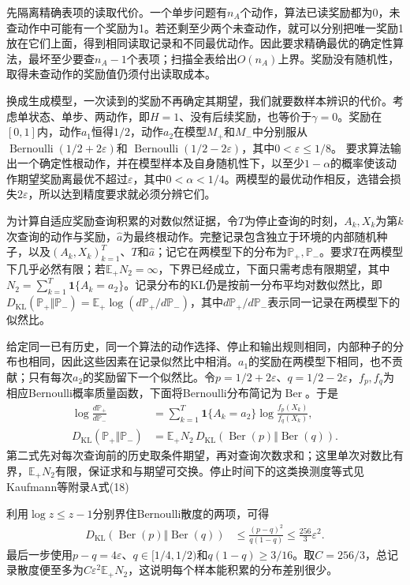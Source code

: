 先隔离精确表项的读取代价。一个单步问题有$n_A$个动作，算法已读奖励都为0，未查动作中可能有一个奖励为1。若还剩至少两个未查动作，就可以分别把唯一奖励1放在它们上面，得到相同读取记录和不同最优动作。因此要求精确最优的确定性算法，最坏至少要查$n_A-1$个表项；扫描全表给出$O(n_A)$上界。奖励没有随机性，取得未查动作的奖励值仍须付出读取成本。

换成生成模型，一次读到的奖励不再确定其期望，我们就要数样本辨识的代价。考虑单状态、单步、两动作，即$H=1$、没有后续奖励，也等价于$\gamma=0$。奖励在$[0,1]$内，动作$a_1$恒得$1/2$，动作$a_2$在模型$M_+$和$M_-$中分别服从
$\operatorname{Bernoulli}(1/2+2\varepsilon)$和
$\operatorname{Bernoulli}(1/2-2\varepsilon)$，其中$0<\varepsilon\leq1/8$。
要求算法输出一个确定性根动作，并在模型样本及自身随机性下，以至少$1-\alpha$的概率使该动作期望奖励离最优不超过$\varepsilon$，其中$0<\alpha<1/4$。两模型的最优动作相反，选错会损失$2\varepsilon$，所以达到精度要求就必须分辨它们。

为计算自适应奖励查询积累的对数似然证据，令$T$为停止查询的时刻，$A_k,X_k$为第$k$次查询的动作与奖励，$\widehat a$为最终根动作。完整记录包含独立于环境的内部随机种子，以及$(A_k,X_k)_{k=1}^T$、$T$和$\widehat a$；记它在两模型下的分布为$\mathbb P_+,\mathbb P_-$。要求$T$在两模型下几乎必然有限；若$\mathbb E_+N_2=\infty$，下界已经成立，下面只需考虑有限期望，其中$N_2=\sum_{k=1}^T\mathbf1\{A_k=a_2\}$。记录分布的KL仍是按前一分布平均对数似然比，即$D_{\mathrm{KL}}(\mathbb P_+\Vert\mathbb P_-)=\mathbb E_+\log(d\mathbb P_+/d\mathbb P_-)$，其中$d\mathbb P_+/d\mathbb P_-$表示同一记录在两模型下的似然比。

给定同一已有历史，同一个算法的动作选择、停止和输出规则相同，内部种子的分布也相同，因此这些因素在记录似然比中相消。$a_1$的奖励在两模型下相同，也不贡献；只有每次$a_2$的奖励留下一个似然比。令$p=1/2+2\varepsilon$、$q=1/2-2\varepsilon$，$f_p,f_q$为相应Bernoulli概率质量函数，下面将Bernoulli分布简记为$\operatorname{Ber}$。于是
\[
 \begin{aligned}
 \log\frac{d\mathbb P_+}{d\mathbb P_-}
 &=\sum_{k=1}^{T}\mathbf1\{A_k=a_2\}
          \log\frac{f_p(X_k)}{f_q(X_k)},\\
 D_{\mathrm{KL}}(\mathbb P_+\Vert\mathbb P_-)
 &=\mathbb E_+N_2\,
       D_{\mathrm{KL}}(\operatorname{Ber}(p)\Vert\operatorname{Ber}(q)).
 \end{aligned}
\]
第二式先对每次查询前的历史取条件期望，再对查询次数求和；这里单次对数比有界，$\mathbb E_+N_2$有限，保证求和与期望可交换。停止时间下的这类换测度等式见Kaufmann等附录A式(18)

利用$\log z\leq z-1$分别界住Bernoulli散度的两项，可得
\[
 \begin{aligned}
 D_{\mathrm{KL}}(\operatorname{Ber}(p)\Vert\operatorname{Ber}(q))
 &\leq\frac{(p-q)^2}{q(1-q)}
 \leq\frac{256}{3}\varepsilon^2.
 \end{aligned}
\]
最后一步使用$p-q=4\varepsilon$、$q\in[1/4,1/2)$和$q(1-q)\geq3/16$。取$C=256/3$，总记录散度便至多为$C\varepsilon^2\mathbb E_+N_2$，这说明每个样本能积累的分布差别很少。

